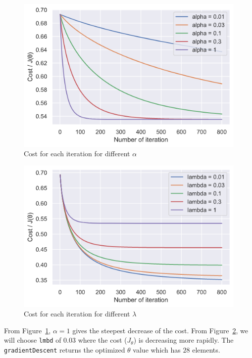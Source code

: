 \documentclass[12pt]{article}
\begin{document}
\begin{figure}[h!]
  \centering
  \includegraphics[scale=0.6]{gradientdescentalpha.png}
  \caption{Cost for each iteration for different $\alpha$}
  \label{fig:gradalpha}
\end{figure}

\begin{figure}[h!]
  \centering
  \includegraphics[scale=0.6]{gradientdescentlambda.png}
  \caption{Cost for each iteration for different $\lambda$}
  \label{fig:gradlambda}
\end{figure}

From Figure~\ref{fig:gradalpha}, $\alpha = 1$ gives the steepest decrease of the cost. From Figure~\ref{fig:gradlambda}, we will choose \texttt{lmbd} of 0.03 where the cost ($J_\theta$) is decreasing more rapidly. The \texttt{gradientDescent} returns the optimized $\theta$ value which has $28$ elements. 
\end{document}
